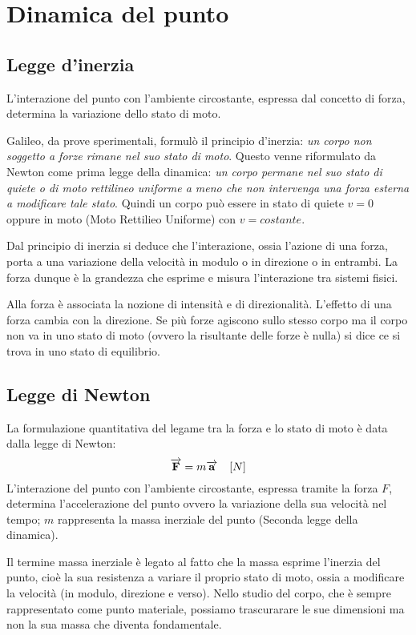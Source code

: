 \documentclass[class=book, crop=false, oneside, 12pt]{standalone}
\begin{document}
\chapter{Dinamica del punto}

\section{Legge d'inerzia}
L'interazione del punto con l'ambiente circostante, espressa dal concetto di forza, determina la variazione dello stato di moto.

Galileo, da prove sperimentali, formulò il principio d'inerzia: \emph{un corpo non soggetto a forze rimane nel suo stato di moto}. 
Questo venne riformulato da Newton come prima legge della dinamica: \emph{un corpo permane nel suo stato di quiete o di moto rettilineo uniforme a meno che non intervenga una forza esterna a modificare tale stato}. 
Quindi un corpo può essere in stato di quiete \(v = 0\) oppure in moto (Moto Rettilieo Uniforme) con \(v = costante\).

Dal principio di inerzia si deduce che l'interazione, ossia l'azione di una forza, porta a una variazione della velocità in modulo o in direzione o in entrambi.
La forza dunque è la grandezza che esprime e misura l'interazione tra sistemi fisici. 

Alla forza è associata la nozione di intensità e di direzionalità.
L'effetto di una forza cambia con la direzione. Se più forze agiscono sullo stesso corpo ma il corpo non va in uno stato di moto (ovvero la risultante delle forze è nulla) si dice ce si trova in uno stato di equilibrio.

\section{Legge di Newton }
La formulazione quantitativa del legame tra la forza e lo stato di moto è data dalla legge di Newton:
\begin{equation}
    \overrightarrow{\mathbf{F}} = m \overrightarrow{\mathbf{a}} \ \udm{N}
\end{equation}
L'interazione del punto con l'ambiente circostante, espressa tramite la forza \(F\), determina l'accelerazione del punto ovvero la variazione della sua velocità nel tempo; \(m\) rappresenta la massa inerziale del punto (Seconda legge della dinamica).

Il termine massa inerziale è legato al fatto che la massa esprime l'inerzia del punto, cioè la sua resistenza a variare il proprio stato di moto, ossia a modificare la velocità (in modulo, direzione e verso).
Nello studio del corpo, che è sempre rappresentato come punto materiale, possiamo trascurarare le sue dimensioni ma non la sua massa che diventa fondamentale.
\end{document}
